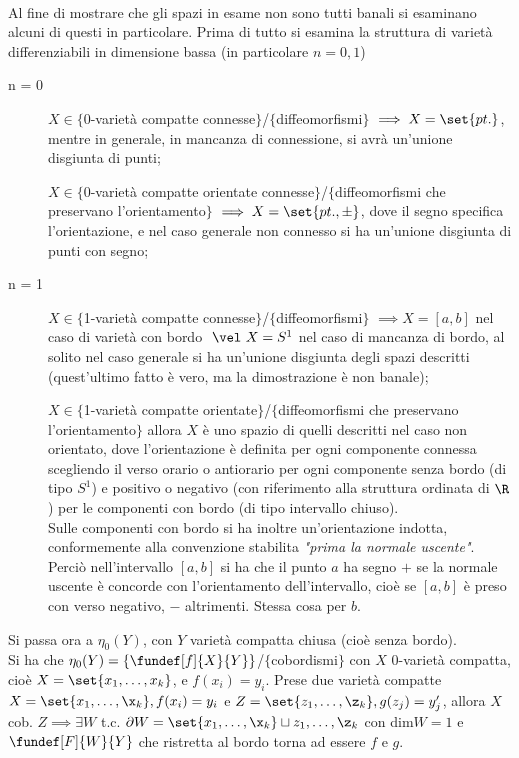 
\begin{oss}
~\\
Al fine di mostrare che gli spazi in esame non sono tutti banali si esaminano alcuni di questi in particolare.
Prima di tutto si esamina la struttura di varietà differenziabili in dimensione bassa (in particolare $n = 0, 1$)
\begin{description}
\item [n = 0] $X \in \{$0-varietà compatte connesse$\}$/$\{$diffeomorfismi$\}$ $\implies X = \set{pt.}$, mentre in generale, in mancanza di connessione, si avrà un'unione disgiunta di punti;

$X \in \{$0-varietà compatte orientate connesse$\}$/$\{$diffeomorfismi che preservano l'orientamento$\}$ $\implies X = \set{pt., \pm}$, dove il segno specifica l'orientazione, e nel caso generale non connesso si ha un'unione disgiunta di punti con segno;
\item [n = 1] $X \in \{$1-varietà compatte connesse$\}$/$\{$diffeomorfismi$\}$ $\implies X = [a,b]$ nel caso di varietà con bordo $~\vel~ X = S^1$ nel caso di mancanza di bordo, al solito nel caso generale si ha un'unione disgiunta degli spazi descritti (quest'ultimo fatto è vero, ma la dimostrazione è non banale);

$X \in \{$1-varietà compatte orientate$\}$/$\{$diffeomorfismi che preservano l'orientamento$\}$ allora $X$ è uno spazio di quelli descritti nel caso non orientato, dove l'orientazione è definita per ogni componente connessa scegliendo il verso orario o antiorario per ogni componente senza bordo (di tipo $S^1$) e positivo o negativo (con riferimento alla struttura ordinata di $\R$) per le componenti con bordo (di tipo intervallo chiuso).\\
Sulle componenti con bordo si ha inoltre un'orientazione indotta, conformemente alla convenzione stabilita \emph{"prima la normale uscente"}. Perciò nell'intervallo $[a,b]$ si ha che il punto $a$ ha segno $+$ se la normale uscente è concorde con l'orientamento dell'intervallo, cioè se $[a,b]$ è preso con verso negativo, $-$ altrimenti. Stessa cosa per $b$.
\end{description}

Si passa ora a $\eta_0(Y)$, con $Y$ varietà compatta chiusa (cioè senza bordo). \\
Si ha che $\eta_0(Y) = \{\fundef[f]{X}{Y}\}$/$\{$cobordismi$\}$ con $X$ 0-varietà compatta, cioè $X = \set{x_1, \dots, x_k}$, e $f(x_i) = y_i$.
Prese due varietà compatte $X = \set{x_1, \dots, \x_k}, f(x_i) = y_i$ e $Z = \set{z_1, \dots, \z_k}, g(z_j) = y'_j$, allora $X$ cob. $Z \implies \exists W$ t.c. $\partial W = \set{x_1, \dots, \x_k}\sqcup{z_1, \dots, \z_k}$ con dim$W = 1$ e $\fundef[F]{W}{Y}$ che ristretta al bordo torna ad essere $f$ e $g$.
\begin{es}
\end{es}
\end{oss}

